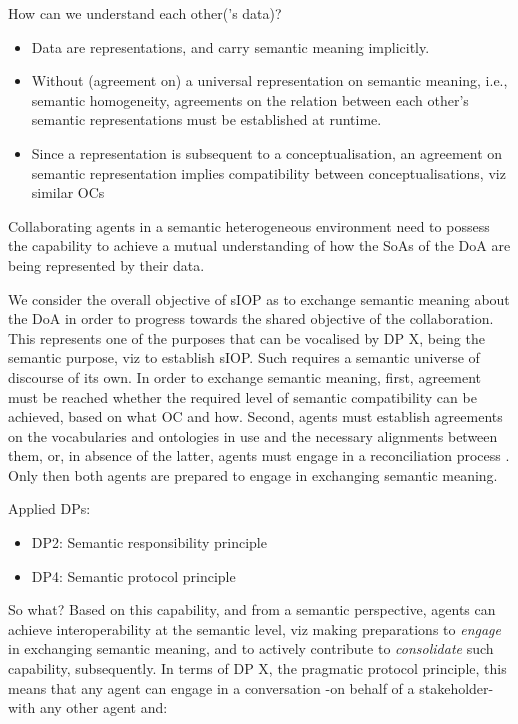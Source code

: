 \documentclass[sort&compress,preprint,3p,authoryear,twocolumn]{elsarticle}
\providecommand{\tightlist}{%
  \setlength{\itemsep}{0pt}\setlength{\parskip}{0pt}}
\theoremstyle{break}			%
\begin{document}
How can we understand each other('s data)?

\begin{itemize}
\tightlist
\item
  Data are representations, and carry semantic meaning implicitly.
\item
  Without (agreement on) a universal representation on semantic meaning,
  i.e., semantic homogeneity, agreements on the relation between each
  other's semantic representations must be established at runtime.
\item
  Since a representation is subsequent to a conceptualisation, an
  agreement on semantic representation implies compatibility between
  conceptualisations, viz similar OCs
\end{itemize}

\begin{mmconcern}\label{cncrn:mmc}
Collaborating agents in a semantic heterogeneous environment need to possess the capability to achieve a mutual understanding of how the SoAs of the DoA are being represented by their data.  
\end{mmconcern}

We consider the overall objective of sIOP as to exchange semantic
meaning about the DoA in order to progress towards the shared objective
of the collaboration. This represents one of the purposes that can be
vocalised by DP X, being the semantic purpose, viz to establish sIOP.
Such requires a semantic universe of discourse of its own. In order to
exchange semantic meaning, first, agreement must be reached whether the
required level of semantic compatibility can be achieved, based on what
OC and how. Second, agents must establish agreements on the vocabularies
and ontologies in use and the necessary alignments between them, or, in
absence of the latter, agents must engage in a reconciliation process
\citep{Diggelen:2007vd}. Only then both agents are prepared to engage in
exchanging semantic meaning.

Applied DPs:

\begin{itemize}
\tightlist
\item
  DP2: Semantic responsibility principle
\item
  DP4: Semantic protocol principle
\end{itemize}

So what? Based on this capability, and from a semantic perspective,
agents can achieve interoperability at the semantic level, viz making
preparations to \emph{engage} in exchanging semantic meaning, and to
actively contribute to \emph{consolidate} such capability, subsequently.
In terms of DP X, the pragmatic protocol principle, this means that any
agent can engage in a conversation -on behalf of a stakeholder- with any
other agent and:
\end{document}
